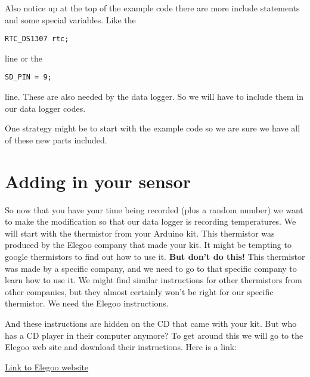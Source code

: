 Also notice up at the top of the example code there are more include statements and some special variables.  Like the 

 \begin{lstlisting}[language=Arduino]
	RTC_DS1307 rtc;
\end{lstlisting}
line or the 
 \begin{lstlisting}[language=Arduino]
	SD_PIN = 9; 
\end{lstlisting}

\noindent line. These are also needed by the data logger. So we will have to include them in our data logger codes. 

One strategy might be to start with the example code so we are sure we have all of these new parts included.

\section{Adding in your sensor}
So now that you have your time being recorded (plus a random number) we want to make the modification so that our data logger is recording temperatures.  We will start with the thermistor from your Arduino kit. This thermistor was produced by the Elegoo company that made your kit.  It might be tempting to google thermistors to find out how to use it. \textbf{But don't do this! } This thermistor was made by a specific company, and we need to go to that specific company to learn how to use it.  We might find similar instructions for other thermistors from other companies, but they almost certainly won't be right for our specific thermistor.  We need the Elegoo instructions. 

And these instructions are hidden on the CD that came with your kit.  But who has a CD player in their computer anymore?  To get around this we will go to the Elegoo web site and download their instructions. Here is a link:

\begin{center}
 \href{https://www.elegoo.com/products/elegoo-uno-project-super-starter-kit}{Link to Elegoo website}
\end{center}

